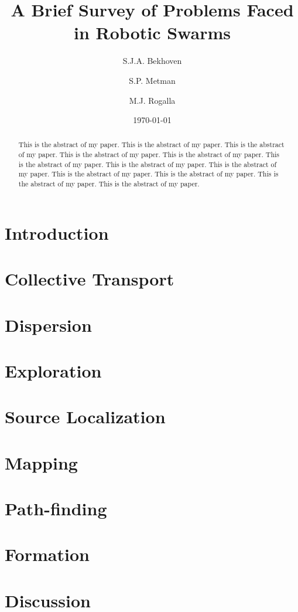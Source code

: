 \documentclass[a4paper]{article}
\title{A Brief Survey of Problems Faced \\ in Robotic Swarms}
\author{S.J.A. Bekhoven  \and
    S.P. Metman \and
    M.J. Rogalla}
\date{\today}
\begin{document}
\maketitle
\thispagestyle{empty}

\begin{abstract}
This is the abstract of my paper.
This is the abstract of my paper.
This is the abstract of my paper.
This is the abstract of my paper.
This is the abstract of my paper.
This is the abstract of my paper.
This is the abstract of my paper.
This is the abstract of my paper.
This is the abstract of my paper.
This is the abstract of my paper.
This is the abstract of my paper.
This is the abstract of my paper.
\end{abstract}


\section{Introduction}
  

\section{Collective Transport}
  
  
\section{Dispersion}
  
 
 \section{Exploration}
  
 
 \section{Source Localization}
  
 
 \section{Mapping}
  
 
 \section{Path-finding}
  
 
 \section{Formation}
  

\section{Discussion}
  




\end{document}
